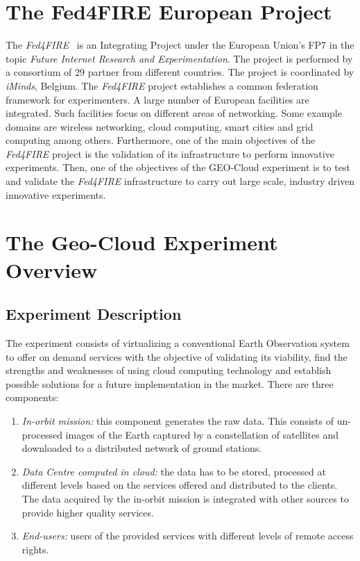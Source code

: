 \section{The Fed4FIRE European Project}%
The \emph{Fed4FIRE}~\cite{Fed4FIRE2014a} is an Integrating Project under the European Union's
\ac{FP7} in the topic \emph{Future
  Internet Research and Experimentation}. The project is performed by a
consortium of 29 partner from different countries. The project is coordinated by
 \emph{iMinds}, Belgium.
The \emph{Fed4FIRE} project establishes a common federation framework for
experimenters. A large  number of European facilities are integrated. Such facilities focus on different  areas
of networking. Some example domains are wireless networking, cloud computing, smart
cities and grid computing among others.
Furthermore, one of the main objectives of the \emph{Fed4FIRE} project is the
validation of its infrastructure to perform
innovative experiments. Then, one of the objectives of the GEO-Cloud experiment
is to test and validate the \emph{Fed4FIRE} infrastructure to carry out large
scale, industry driven innovative experiments.

\section{The Geo-Cloud Experiment Overview}


\subsection{Experiment Description}

The experiment consists of virtualizing a conventional Earth Observation system to offer on
demand services with the objective of validating its viability, find
the strengths and weaknesses of using cloud computing technology and establish
possible solutions for a future implementation in the market. There are three
components:
\begin{enumerate}
\item \emph{In-orbit mission:} this component generates the raw data. This
  consists of un-processed images of the Earth captured by a constellation of
  satellites and downloaded to a distributed network of ground stations.
\item \emph{Data Centre computed in cloud:} the data has to be stored, processed at different levels based on the services offered and distributed to the clients. The data acquired by the in-orbit mission is integrated with other sources to provide higher quality services.
\item \emph{End-users:} users of the provided services with different levels of remote access rights.

\end{enumerate}


